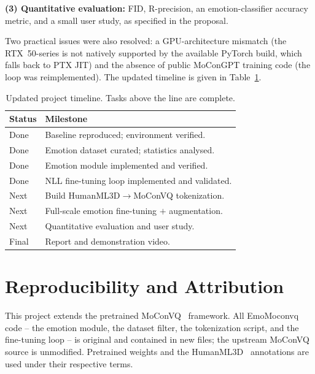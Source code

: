 \documentclass[conference]{IEEEtran}
\begin{document}
\textbf{(3) Quantitative evaluation:} FID, R-precision, an emotion-classifier
accuracy metric, and a small user study, as specified in the proposal.

Two practical issues were also resolved: a GPU-architecture mismatch (the
RTX~50-series is not natively supported by the available PyTorch build, which
falls back to PTX JIT) and the absence of public MoConGPT training code (the
loop was reimplemented). The updated timeline is given in
Table~\ref{tab:timeline}.

\begin{table}[t]
\caption{Updated project timeline. Tasks above the line are complete.}
\label{tab:timeline}
\centering
\small
\begin{tabular}{p{1.6cm}p{5.6cm}}
\toprule
\textbf{Status} & \textbf{Milestone} \\
\midrule
Done & Baseline reproduced; environment verified. \\
Done & Emotion dataset curated; statistics analysed. \\
Done & Emotion module implemented and verified. \\
Done & NLL fine-tuning loop implemented and validated. \\
\midrule
Next & Build HumanML3D$\rightarrow$MoConVQ tokenization. \\
Next & Full-scale emotion fine-tuning $+$ augmentation. \\
Next & Quantitative evaluation and user study. \\
Final & Report and demonstration video. \\
\bottomrule
\end{tabular}
\end{table}

\section*{Reproducibility and Attribution}
This project extends the pretrained MoConVQ~\cite{yao2023moconvq} framework.
All EmoMoconvq code -- the emotion module, the dataset filter, the
tokenization script, and the fine-tuning loop -- is original and contained in
new files; the upstream MoConVQ source is unmodified. Pretrained weights and
the HumanML3D~\cite{guo2022generating} annotations are used under their
respective terms.



\end{document}
